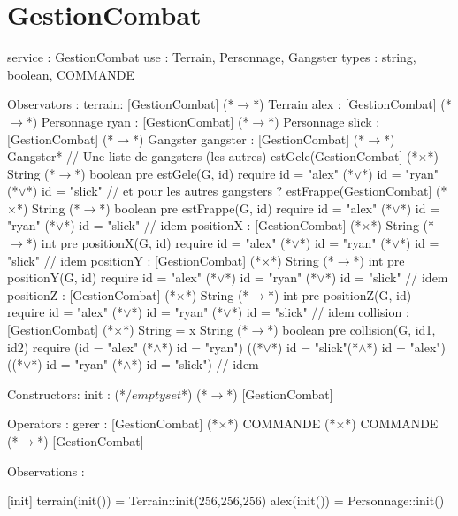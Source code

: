 \documentclass[a4paper, 11pt]{report}
\begin{document}
\section{GestionCombat}
\begin{Spe}
service : GestionCombat
use : Terrain, Personnage, Gangster  
types : string, boolean, COMMANDE

Observators :
      terrain: [GestionCombat] (*$\rightarrow$*) Terrain
      alex : [GestionCombat] (*$\rightarrow$*) Personnage
      ryan : [GestionCombat] (*$\rightarrow$*) Personnage
      slick : [GestionCombat] (*$\rightarrow$*) Gangster 
      gangster :  [GestionCombat] (*$\rightarrow$*) {Gangster*} // Une liste de gangsters (les autres) 
      estGele(GestionCombat] (*$\times$*) String (*$\rightarrow$*) boolean 
            pre estGele(G, id) require id = "alex" (*$\lor$*) id = "ryan" (*$\lor$*) id = "slick" // et pour les autres gangsters ?  
      estFrappe(GestionCombat] (*$\times$*) String (*$\rightarrow$*) boolean 
            pre estFrappe(G, id) require id = "alex" (*$\lor$*) id = "ryan" (*$\lor$*) id = "slick" // idem 
      positionX : [GestionCombat] (*$\times$*) String (*$\rightarrow$*) int
            pre positionX(G, id) require id = "alex" (*$\lor$*) id = "ryan" (*$\lor$*) id = "slick" // idem 
      positionY :  [GestionCombat] (*$\times$*) String (*$\rightarrow$*) int 
            pre positionY(G, id) require id = "alex" (*$\lor$*) id = "ryan" (*$\lor$*) id = "slick" // idem 
      positionZ :   [GestionCombat] (*$\times$*) String (*$\rightarrow$*) int
            pre positionZ(G, id) require id = "alex" (*$\lor$*) id = "ryan" (*$\lor$*) id = "slick" // idem  
      collision : [GestionCombat] (*$\times$*) String = x String (*$\rightarrow$*) boolean
            pre collision(G, id1, id2) require (id = "alex" (*$\land$*) id = "ryan")
            ((*$\lor$*) id = "slick"(*$\land$*) id = "alex") 
            ((*$\lor$*) id = "ryan"
            (*$\land$*) id = "slick") // idem 

      Constructors:
      init : (*$/emptyset$*) (*$\rightarrow$*) [GestionCombat]
      
Operators :
      gerer : [GestionCombat] (*$\times$*) COMMANDE (*$\times$*) COMMANDE (*$\rightarrow$*) [GestionCombat]

Observations : 

[init]
      terrain(init()) = Terrain::init(256,256,256)
      alex(init()) = Personnage::init()

\end{Spe}
\end{document}
